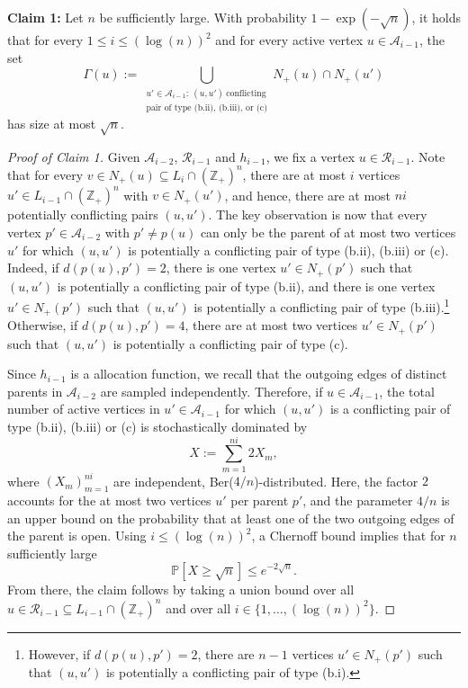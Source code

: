 \documentclass[11pt]{article}
\newcommand{\Z}{\mathbb{Z}}
\newcommand{\A}{\mathcal{A}}
\theoremstyle{remark}
\begin{document}
\textbf{Claim 1:} Let $n$ be sufficiently large. With probability $1- \exp(-\sqrt{n})$, it holds that for every $1 \le i \le (\log(n))^2$ and for every active vertex $u \in \A_{i-1}$, the set
\begin{equation}
   \Gamma(u) := \bigcup_{\substack{u' \in \A_{i-1}:\ (u,u')\ \text{conflicting} \\ \text{pair of type (b.ii), (b.iii), or (c)}}} N_+(u) \cap N_+(u')
\end{equation}
has size at most $\sqrt{n}$.
\begin{proof}[Proof of Claim 1]
    Given $\A_{i-2}$, $\mathcal R_{i-1}$ and $h_{i-1}$, we fix a vertex $u \in \mathcal R_{i-1}$. Note that for every $v \in N_+(u)\subseteq L_i \cap (\Z_+)^n$, there are at most $i$ vertices $u' \in L_{i-1} \cap (\Z_+)^n $ with $v \in N_+(u')$, and hence, there are at most $ni$ potentially conflicting pairs $(u,u')$. 
    The key observation is now that every vertex $p' \in \A_{i-2}$ with $p' \neq p(u)$ can only be the parent of at most two vertices $u'$ for which $(u,u')$ is potentially a conflicting pair of type (b.ii), (b.iii) or (c). Indeed, if $d(p(u),p')=2$, there is one vertex $u' \in N_+(p')$ such that $(u,u')$ is potentially a conflicting pair of type (b.ii), and there is one vertex $u' \in N_+(p')$ such that $(u,u')$ is potentially a conflicting pair of type (b.iii).\footnote{However, if $d(p(u),p')=2$, there are $n-1$ vertices $u' \in N_+(p')$ such that $(u,u')$ is potentially a conflicting pair of type (b.i).}
    Otherwise, if $d(p(u),p')=4$, there are at most two vertices $u' \in N_+(p')$ such that $(u,u')$ is potentially a conflicting pair of type (c). 

    Since $h_{i-1}$ is a allocation function, we recall that the outgoing edges of distinct parents in $\A_{i-2}$ are sampled independently. Therefore, if $u \in \A_{i-1}$, the total number of active vertices in $u' \in \A_{i-1}$ for which $(u,u')$ is a conflicting pair of type (b.ii), (b.iii) or (c) is stochastically dominated by 
    \begin{equation}
        X := \sum_{m=1}^{ni} 2 X_m,
    \end{equation}
    where $(X_m)_{m=1}^{ni}$ are independent, Ber($4/n$)-distributed. Here, the factor $2$ accounts for the at most two vertices $u'$ per parent $p'$, and the parameter $4/n$ is an upper bound on the probability that at least one of the two outgoing edges of the parent is open. Using $i \le (\log(n))^2$, a Chernoff bound implies that for $n$ sufficiently large
    \begin{equation}
        \mathbb P[X \ge \sqrt{n}] \le e^{-2\sqrt{n}}.
    \end{equation}
    From there, the claim follows by taking a union bound over all $u \in \mathcal R_{i-1} \subseteq L_{i-1} \cap (\Z_+)^n$ and over all $i \in \{1,\ldots,(\log(n))^2\}$.
\end{proof}
\end{document}
